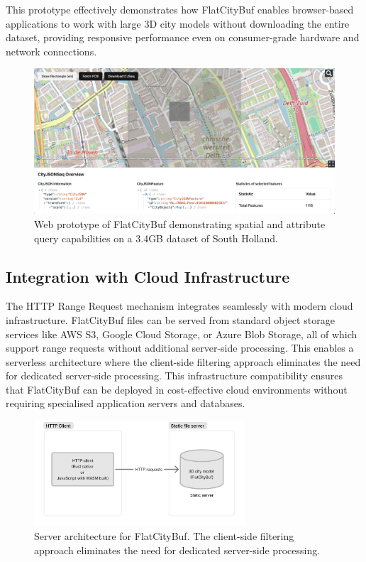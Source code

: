 This prototype effectively demonstrates how FlatCityBuf enables browser-based applications to work with large 3D city models without downloading the entire dataset, providing responsive performance even on consumer-grade hardware and network connections.

\begin{figure}[ht]
  \centering
  \includegraphics[width=1.0\textwidth]{figs/methodology/web_prototype.png}
  \caption{Web prototype of FlatCityBuf demonstrating spatial and attribute query capabilities on a 3.4GB dataset of South Holland.}
  \label{fig:methodology:http_range_requests:web_prototype}
\end{figure}

\subsection{Integration with Cloud Infrastructure}
\label{methodology:http_range_requests:cloud_integration}

The HTTP Range Request mechanism integrates seamlessly with modern cloud infrastructure. FlatCityBuf files can be served from standard object storage services like AWS S3, Google Cloud Storage, or Azure Blob Storage, all of which support range requests without additional server-side processing. This enables a serverless architecture where the client-side filtering approach eliminates the need for dedicated server-side processing. This infrastructure compatibility ensures that FlatCityBuf can be deployed in cost-effective cloud environments without requiring specialised application servers and databases.

\begin{figure}[ht]
  \centering
  \includegraphics[width=0.7\textwidth]{figs/methodology/server_architecture_fcb.png}
  \caption{Server architecture for FlatCityBuf. The client-side filtering approach eliminates the need for dedicated server-side processing.}
  \label{fig:methodology:http_range_requests:server_architecture}
\end{figure}
